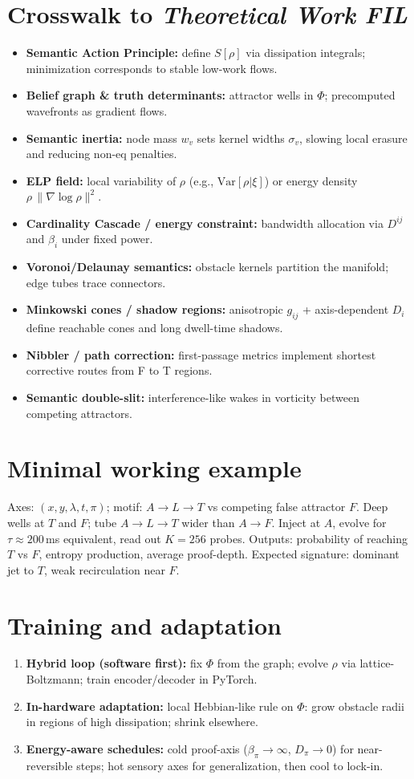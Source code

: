 \documentclass[11pt]{article}
\begin{document}
\section{Crosswalk to \emph{Theoretical Work FIL}}
\begin{itemize}[leftmargin=2em]
  \item \textbf{Semantic Action Principle:} define $S[\rho]$ via dissipation integrals; minimization corresponds to stable low-work flows.
  \item \textbf{Belief graph \& truth determinants:} attractor wells in $\Phi$; precomputed wavefronts as gradient flows.
  \item \textbf{Semantic inertia:} node mass $w_v$ sets kernel widths $\sigma_v$, slowing local erasure and reducing non-eq penalties.
  \item \textbf{ELP field:} local variability of $\rho$ (e.g., $\mathrm{Var}[\rho|\xi]$) or energy density $\rho\,\|\nabla\log\rho\|^2$.
  \item \textbf{Cardinality Cascade / energy constraint:} bandwidth allocation via $D^{ij}$ and $\beta_i$ under fixed power.
  \item \textbf{Voronoi/Delaunay semantics:} obstacle kernels partition the manifold; edge tubes trace connectors.
  \item \textbf{Minkowski cones / shadow regions:} anisotropic $g_{ij}$ + axis-dependent $D_i$ define reachable cones and long dwell-time shadows.
  \item \textbf{Nibbler / path correction:} first-passage metrics implement shortest corrective routes from F to T regions.
  \item \textbf{Semantic double-slit:} interference-like wakes in vorticity between competing attractors.
\end{itemize}
\section{Minimal working example}
Axes: $(x,y,\lambda,t,\pi)$; motif: $A\to L\to T$ vs competing false attractor $F$. Deep wells at $T$ and $F$; tube $A\to L\to T$ wider than $A\to F$. Inject at $A$, evolve for $\tau\approx 200$\,ms equivalent, read out $K{=}256$ probes. Outputs: probability of reaching $T$ vs $F$, entropy production, average proof-depth. Expected signature: dominant jet to $T$, weak recirculation near $F$.
\section{Training and adaptation}
\begin{enumerate}[leftmargin=2em]
  \item \textbf{Hybrid loop (software first):} fix $\Phi$ from the graph; evolve $\rho$ via lattice-Boltzmann; train encoder/decoder in PyTorch.
  \item \textbf{In-hardware adaptation:} local Hebbian-like rule on $\Phi$: grow obstacle radii in regions of high dissipation; shrink elsewhere.
  \item \textbf{Energy-aware schedules:} cold proof-axis ($\beta_\pi\!\to\!\infty$, $D_\pi\!\to\!0$) for near-reversible steps; hot sensory axes for generalization, then cool to lock-in.
\end{enumerate}
\end{document}
